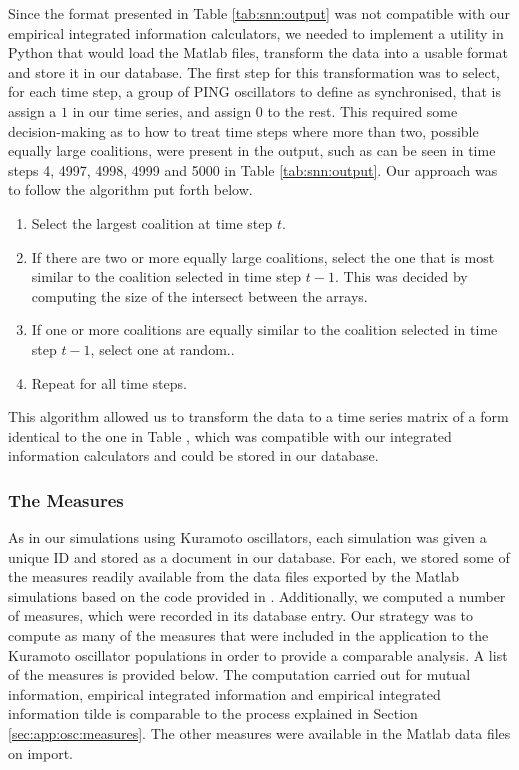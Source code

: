 \documentclass[a4paper,11pt]{article}
\begin{document}
Since the format presented in Table \ref{tab:snn:output} was not compatible with our empirical integrated information calculators, we needed to implement a utility in Python that would load the Matlab files, transform the data into a usable format and store it in our database. The first step for this transformation was to select, for each time step, a group of PING oscillators to define as synchronised, that is assign a $1$ in our time series, and assign $0$ to the rest. This required some decision-making as to how to treat time steps where more than two, possible equally large coalitions, were present in the output, such as can be seen in time steps 4, 4997, 4998, 4999 and 5000 in Table \ref{tab:snn:output}. Our approach was to follow the algorithm put forth below.

\begin{enumerate}
\item{Select the largest coalition at time step $t$.}
\item{If there are two or more equally large coalitions, select the one that is most similar to the coalition selected in time step $t - 1$. This was decided by computing the size of the intersect between the arrays.}
\item{If one or more coalitions are equally similar to the coalition selected in time step $t-1$, select one at random.}.
\item{Repeat for all time steps.}
\end{enumerate}

This algorithm allowed us to transform the data to a time series matrix of a form identical to the one in Table \label{tab:timeseries}, which was compatible with our integrated information calculators and could be stored in our database.

\subsubsection{The Measures}
\label{sec:app:snn:measures}

As in our simulations using Kuramoto oscillators, each simulation was given a unique ID and stored as a document in our database. For each, we stored some of the measures readily available from the data files exported by the Matlab simulations based on the code provided in \cite{Bhowmik2013}. Additionally, we computed a number of measures, which were recorded in its database entry. Our strategy was to compute as many of the measures that were included in the application to the Kuramoto oscillator populations in order to provide a comparable analysis. A list of the measures is provided below. The computation carried out for mutual information, empirical integrated information and empirical integrated information tilde is comparable to the process explained in Section \ref{sec:app:osc:measures}. The other measures were available in the Matlab data files on import.\\
\end{document}
